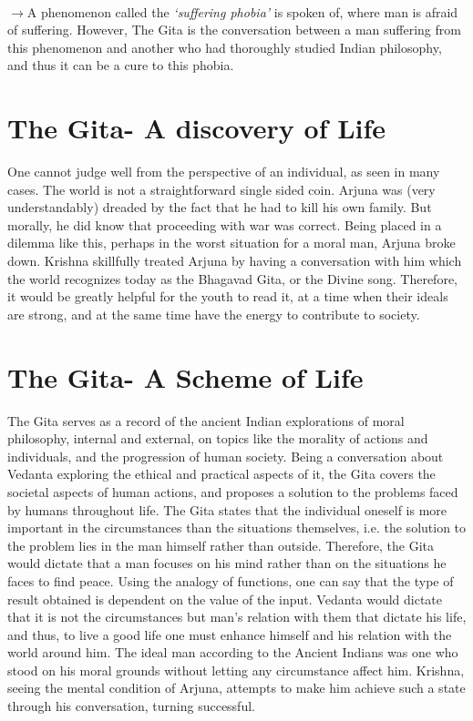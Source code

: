 \documentclass{article}
\newcommand{\tit}[1]{\textit{#1}}
\newcommand{\p}{\\$\to$\hspace{2mm}}
\begin{document}
\p A phenomenon called the \tit{`suffering phobia'} is spoken of, where man is afraid of suffering. However, The Gita is the conversation between a man suffering from this phenomenon and another who had thoroughly studied Indian philosophy, and thus it can be a cure to this phobia.
\newpage \section{The Gita- A discovery of Life}
One cannot judge well from the perspective of an individual, as seen in many cases. The world is not a straightforward single sided coin. Arjuna was (very understandably) dreaded by the fact that he had to kill his own family. But morally, he did know that proceeding with war was correct. Being placed in a dilemma like this, perhaps in the worst situation for a moral man, Arjuna broke down. Krishna skillfully treated Arjuna by having a conversation with him which the world recognizes today as the Bhagavad Gita, or the Divine song. Therefore, it would be greatly helpful for the youth to read it, at a time when their ideals are strong, and at the same time have the energy to contribute to society.
\newpage \section{The Gita- A Scheme of Life}
The Gita serves as a record of the ancient Indian explorations of moral philosophy, internal and external, on topics like the morality of actions and individuals, and the progression of human society. Being a conversation about Vedanta exploring the ethical and practical aspects of it, the Gita covers the societal aspects of human actions, and proposes a solution to the problems faced by humans throughout life. The Gita states that the individual oneself is more important in the circumstances than the situations themselves, i.e. the solution to the problem lies in the man himself rather than outside. Therefore, the Gita would dictate that a man focuses on his mind rather than on the situations he faces to find peace. Using the analogy of functions, one can say that the type of result obtained is dependent on the value of the input. Vedanta would dictate that it is not the circumstances but man's relation with them that dictate his life, and thus, to live a good life one must enhance himself and his relation with the world around him. The ideal man according to the Ancient Indians was one who stood on his moral grounds without letting any circumstance affect him. Krishna, seeing the mental condition of Arjuna, attempts to make him achieve such a state through his conversation, turning successful.
\end{document}
